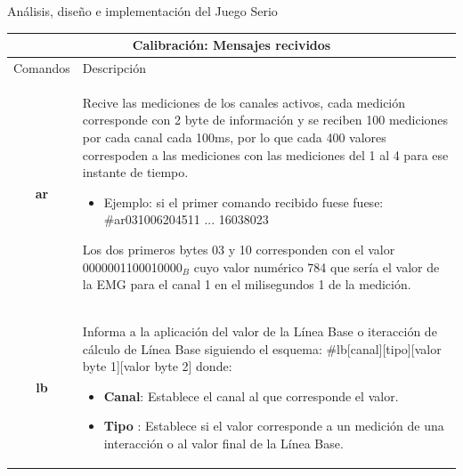 \begin{thesischapter}{2} {Análisis, diseño e implementación del Juego Serio}
    \begin{table}[ht]
        \centering
        \begin{tabular}{ |c|p{14cm}|}
            \hline
            \multicolumn{2}{|c|}{Calibración: Mensajes recividos} \\
            \hline
            Comandos        &   Descripción \\\hline
            \textbf{ar}     &   \begin{minipage}{14cm}
                                    \vspace{2pt}    
                                    Recive las mediciones de los canales activos, cada medición corresponde con 2 byte de información y se reciben 100 mediciones por cada canal cada 100ms, 
                                    por lo que cada 400 valores correspoden a las mediciones con las mediciones del 1 al 4 para ese instante de tiempo.
                                    \begin{itemize}
                                        \item Ejemplo: si el primer comando recibido fuese fuese: \#ar031006204511 ... 16038023
                                    \end{itemize}
                                    Los dos primeros bytes 03 y 10 corresponden con el valor 0000001100010000$_{B}$ cuyo valor numérico  784 que sería el valor de la EMG para el canal 1 en el milisegundos 
                                    1 de la medición.
                                    \vspace{2pt}    
                                \end{minipage}\\\hline    
            \textbf{lb}     &   \begin{minipage}{14cm}
                                    \vspace{1pt}
                                    Informa a la aplicación del valor de la Línea Base o iteracción de cálculo de Línea Base siguiendo el esquema: \#lb[canal][tipo][valor byte 1][valor byte 2] donde:
                                    \begin{itemize}
                                        \item \textbf{Canal}: Establece el canal al que corresponde el valor.
                                        \item \textbf{Tipo} : Establece si el valor corresponde a un medición de una interacción o al valor final de la Línea Base.

\end{itemize}
\end{minipage}
\end{tabular}
\end{table}
\end{thesischapter}
